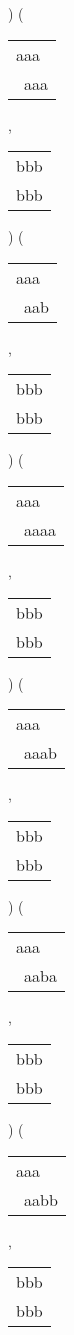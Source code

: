 ) 
 ( 
\begin{tabular}{|l|} \hline
aaa\  \\
\ aaa \\
\hline
\end{tabular} 
 , 
\begin{tabular}{|l|} \hline
bbb \\
bbb \\
\hline
\end{tabular} 
) 
 ( 
\begin{tabular}{|l|} \hline
aaa\  \\
\ aab \\
\hline
\end{tabular} 
 , 
\begin{tabular}{|l|} \hline
bbb \\
bbb \\
\hline
\end{tabular} 
) 
 ( 
\begin{tabular}{|l|} \hline
aaa\ \  \\
\ aaaa \\
\hline
\end{tabular} 
 , 
\begin{tabular}{|l|} \hline
bbb \\
bbb \\
\hline
\end{tabular} 
) 
 ( 
\begin{tabular}{|l|} \hline
aaa\ \  \\
\ aaab \\
\hline
\end{tabular} 
 , 
\begin{tabular}{|l|} \hline
bbb \\
bbb \\
\hline
\end{tabular} 
) 
 ( 
\begin{tabular}{|l|} \hline
aaa\ \  \\
\ aaba \\
\hline
\end{tabular} 
 , 
\begin{tabular}{|l|} \hline
bbb \\
bbb \\
\hline
\end{tabular} 
) 
 ( 
\begin{tabular}{|l|} \hline
aaa\ \  \\
\ aabb \\
\hline
\end{tabular} 
 , 
\begin{tabular}{|l|} \hline
bbb \\
bbb \\
\hline
\end{tabular} 
